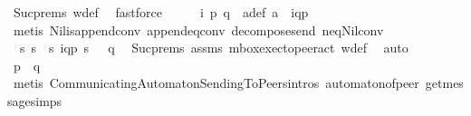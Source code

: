 \begin{isabellebody}
\ Suc{\isachardot}{\kern0pt}prems{\isacharparenleft}{\kern0pt}{}{\isacharparenright}{\kern0pt}\ w{\isacharunderscore}{\kern0pt}def\ \isamarkupfalse%
\ fastforce\isanewline
\ \ \isamarkupfalse%
\ \isamarkupfalse%
\ i\ p\ q\ \ a{\isacharunderscore}{\kern0pt}def{\isacharcolon}{\kern0pt}\ {\isachardoublequoteopen}a\ {\isacharequal}{\kern0pt}\ {\isacharparenleft}{\kern0pt}{\isacharbang}{\kern0pt}{\isasymlangle}{\isacharparenleft}{\kern0pt}i\isactrlbsup q{\isasymrightarrow}p\isactrlesup {\isacharparenright}{\kern0pt}{\isasymrangle}{\isacharparenright}{\kern0pt}{\isachardoublequoteclose}\ \ \isamarkupfalse%
\ {\isacharparenleft}{\kern0pt}metis\ Nil{\isacharunderscore}{\kern0pt}is{\isacharunderscore}{\kern0pt}append{\isacharunderscore}{\kern0pt}conv\ append{}{\isacharunderscore}{\kern0pt}eq{\isacharunderscore}{\kern0pt}conv\ decompose{\isacharunderscore}{\kern0pt}send\ neq{\isacharunderscore}{\kern0pt}Nil{\isacharunderscore}{\kern0pt}conv{\isacharparenright}{\kern0pt}\isanewline
\ \ \isamarkupfalse%
\ \isamarkupfalse%
\ {\isachardoublequoteopen}{\isasymexists}\ s{}\ s{}\ {\isachardot}{\kern0pt}\ {\isacharparenleft}{\kern0pt}s{}{\isacharcomma}{\kern0pt}\ {\isacharbang}{\kern0pt}{\isasymlangle}{\isacharparenleft}{\kern0pt}i\isactrlbsup q{\isasymrightarrow}p\isactrlesup {\isacharparenright}{\kern0pt}{\isasymrangle}{\isacharcomma}{\kern0pt}\ s{}{\isacharparenright}{\kern0pt}\ {\isasymin}\ {\isasymR}\ q{\isachardoublequoteclose}\ \isamarkupfalse%
\ Suc{\isachardot}{\kern0pt}prems{\isacharparenleft}{\kern0pt}{}{\isacharparenright}{\kern0pt}\ assms{\isacharparenleft}{\kern0pt}{}{\isacharparenright}{\kern0pt}\ mbox{\isacharunderscore}{\kern0pt}exec{\isacharunderscore}{\kern0pt}to{\isacharunderscore}{\kern0pt}peer{\isacharunderscore}{\kern0pt}act\ w{\isacharunderscore}{\kern0pt}def\ \isamarkupfalse%
\ auto\isanewline
\ \ \isamarkupfalse%
\ \isamarkupfalse%
\ {\isachardoublequoteopen}p\ {\isasymin}\ {\isasymP}\isactrlsub {\isacharbang}{\kern0pt}{\isacharparenleft}{\kern0pt}q{\isacharparenright}{\kern0pt}{\isachardoublequoteclose}\ \isamarkupfalse%
\ {\isacharparenleft}{\kern0pt}metis\ CommunicatingAutomaton{\isachardot}{\kern0pt}SendingToPeers{\isachardot}{\kern0pt}intros\ automaton{\isacharunderscore}{\kern0pt}of{\isacharunderscore}{\kern0pt}peer\ get{\isacharunderscore}{\kern0pt}message{\isachardot}{\kern0pt}simps{\isacharparenleft}{\kern0pt}{}{\isacharparenright}{\kern0pt}\isanewline

\end{isabellebody}
